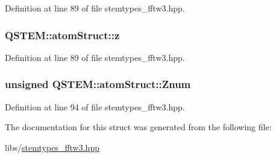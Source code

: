 Definition at line 89 of file stemtypes\-\_\-fftw3.\-hpp.

\hypertarget{struct_q_s_t_e_m_1_1atom_struct_a079588e9240e40c297ec1d274b3dd80d}{
\subsubsection[{z}]{ Q\-S\-T\-E\-M\-::atom\-Struct\-::z}}\label{struct_q_s_t_e_m_1_1atom_struct_a079588e9240e40c297ec1d274b3dd80d}


Definition at line 89 of file stemtypes\-\_\-fftw3.\-hpp.

\hypertarget{struct_q_s_t_e_m_1_1atom_struct_ad4ad2c76b7b9409af6f6c108d5c3e28a}{
\subsubsection[{Znum}]{\setlength{\rightskip}{0pt plus 5cm}unsigned Q\-S\-T\-E\-M\-::atom\-Struct\-::\-Znum}}\label{struct_q_s_t_e_m_1_1atom_struct_ad4ad2c76b7b9409af6f6c108d5c3e28a}


Definition at line 94 of file stemtypes\-\_\-fftw3.\-hpp.



The documentation for this struct was generated from the following file\-:\begin{DoxyCompactItemize}
\item 
libs/\hyperlink{stemtypes__fftw3_8hpp}{stemtypes\-\_\-fftw3.\-hpp}\end{DoxyCompactItemize}

